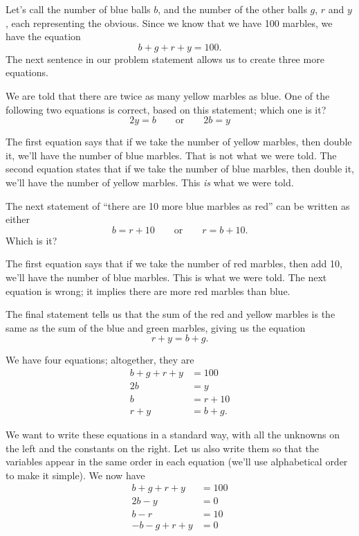 {Let's call the number of blue balls $b$, and the number of the other balls $g$, $r$ and $y$, each representing the obvious. Since we know that we have 100 marbles, we have the equation 
\[
b+g+r+y=100.
\]
The next sentence in our problem statement allows us to create three more equations. 

We are told that there are twice as many yellow marbles as blue. One of the following two equations is correct, based on this statement; which one is it? 
\[
2y=b \quad\quad \text{or} \quad\quad2b=y
\]


The first equation says that if we take the number of yellow marbles, then double it, we'll have the number of blue marbles. That is not what we were told. The second equation states that if we take the number of blue marbles, then double it, we'll have the number of yellow marbles. This \textit{is} what we were told.

The next statement of ``there are 10 more blue marbles as red'' can be written as either 
\[
b=r+10 \quad\quad \text{or} \quad\quad r=b+10.
\]
Which is it?

The first equation says that if we take the number of red marbles, then add 10, we'll have the number of blue marbles. This is what we were told. The next equation is wrong; it implies there are more red marbles than blue.

The final statement tells us that the sum of the red and yellow marbles is the same as the sum of the blue and green marbles, giving us the equation 
\[
r+y=b+g.
\]

We have four equations; altogether, they are 
\begin{align*}
  b+g+r+y &= 100\\
  2b&=y\\
  b&=r+10\\
  r+y&=b+g. 
\end{align*}

We want to write these equations in a standard way, with all the unknowns on the left and the constants on the right. Let us also write them so that the variables appear in the same order in each equation (we'll use alphabetical order to make it simple). We now have \begin{align*}
 b+g+r+y&=100\\
 2b-y&=0\\b-r&=10\\
 -b-g+r+y&=0 
\end{align*}

}
